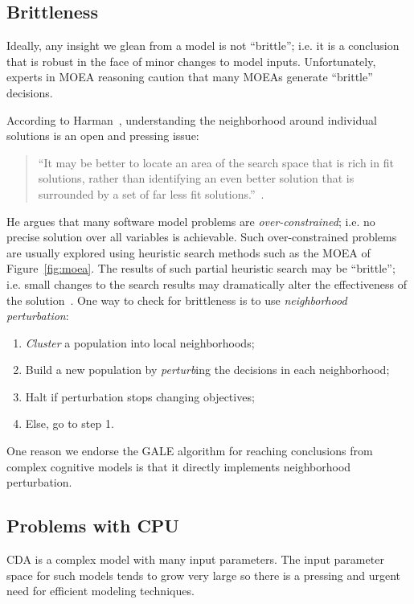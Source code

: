 \documentclass[journal]{IEEEtran}
\newcommand{\fig}[1]{Figure~\ref{fig:#1}}
\begin{document}
\subsection{Brittleness}

Ideally, any insight we glean from a model is not ``brittle''; i.e. it is a conclusion that is robust in the face of minor changes to model inputs.
Unfortunately, experts in MOEA reasoning caution that many MOEAs generate ``brittle'' decisions.

According to Harman~\cite{harman01}, understanding the neighborhood around individual solutions is an open and pressing issue:
\begin{quote}
 ``It may be better to locate an area of the search space that is rich in fit solutions, rather than identifying an even better solution that is surrounded by a set of far less fit solutions.''~\cite{harman04}.  
\end{quote}

He argues that many software model problems are {\em over-constrained}; i.e.  no precise solution over all variables is achievable.  
Such over-constrained problems are usually explored using heuristic search methods such
as the MOEA of \fig{moea}.
The results of such partial heuristic search may be ``brittle''; i.e. small changes to the search results may dramatically alter the effectiveness of the solution~\cite{harman04}.  
 One way to check for brittleness is to use {\em neighborhood perturbation}:
\begin{enumerate}
\item {\em Cluster}  a  population into local neighborhoods;
\item  Build a new population by {\em perturb}ing the decisions in each neighborhood;
\item Halt if perturbation stops changing objectives;
\item Else, go to step 1.\end{enumerate}
One reason we endorse the GALE algorithm for reaching conclusions from complex cognitive models is that it directly implements neighborhood perturbation.



\subsection{Problems with CPU}\label{sec:cpu}
CDA is a complex model with many input parameters. The 
input parameter space for such models tends to grow very large so there is a 
pressing and urgent need for efficient
modeling techniques.
\end{document}
